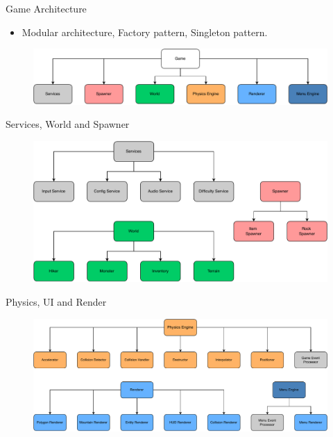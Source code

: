 
\begin{frame}{Game Architecture}
    \begin{itemize}
        \item Modular architecture, Factory pattern, Singleton pattern.
    \end{itemize}
    \begin{figure}
        \centering
        \includegraphics[scale=0.50]{../figures/Game.pdf}
    \end{figure}
\end{frame}

\begin{frame}{Services, World and Spawner}
    \begin{figure}
        \centering
        \includegraphics[scale=0.50]{../figures/Services-World-Spawner.pdf}
    \end{figure} 
\end{frame}

\begin{frame}{Physics, UI and Render}
    \begin{figure}
        \centering
        \includegraphics[scale=0.50]{../figures/Physics-UI-Renderer.pdf}
    \end{figure} 
\end{frame}

